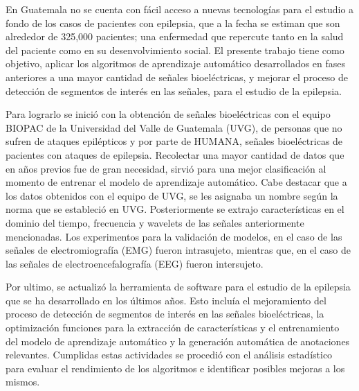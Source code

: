 


En Guatemala no se cuenta con fácil acceso a nuevas tecnologías para el estudio a fondo de los casos de pacientes con epilepsia, que a la fecha se estiman que son alrededor de 325,000 pacientes; una enfermedad que repercute tanto en la salud del paciente como en su desenvolvimiento social. 
El presente trabajo tiene como objetivo, aplicar los algoritmos de aprendizaje automático desarrollados en fases anteriores a una mayor cantidad de señales bioeléctricas, y mejorar el proceso de detección de segmentos de interés en las señales, para el estudio de la epilepsia.

Para lograrlo se inició con la obtención de señales bioeléctricas con el equipo BIOPAC de la Universidad del Valle de Guatemala (UVG), de personas que no sufren de ataques epilépticos y por parte de HUMANA, señales bioeléctricas de pacientes con ataques de epilepsia.
Recolectar una mayor cantidad de datos que en años previos fue de gran necesidad, sirvió para una mejor clasificación al momento de entrenar el modelo de aprendizaje automático. Cabe destacar que a los datos obtenidos con el equipo de UVG, se les asignaba un nombre según la norma que se estableció en UVG. Posteriormente se extrajo características en el dominio del tiempo, frecuencia y wavelets de las señales anteriormente mencionadas. Los experimentos para la validación de modelos, en el caso de las señales de electromiografía (EMG) fueron intrasujeto, mientras que, en el caso de las señales de electroencefalografía (EEG) fueron intersujeto. 

Por ultimo, se actualizó la herramienta de software para el estudio de la epilepsia que se ha desarrollado en los últimos años. Esto incluía el mejoramiento del proceso de detección de segmentos de interés en las señales bioeléctricas, la optimización funciones para la extracción de características y el entrenamiento del modelo de aprendizaje automático y la generación automática de anotaciones relevantes. Cumplidas estas actividades se procedió con el análisis estadístico  para evaluar el rendimiento de los algoritmos e identificar posibles mejoras a los mismos.